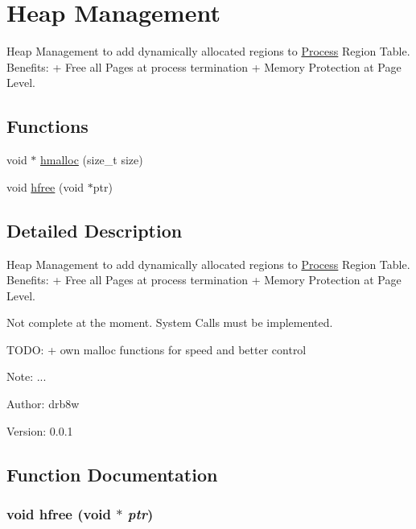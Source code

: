 \hypertarget{group___v_m_m___h_e_a_p}{
\section{Heap Management}
\label{group___v_m_m___h_e_a_p}
}
Heap Management to add dynamically allocated regions to \hyperlink{struct_process}{Process} Region Table. Benefits: + Free all Pages at process termination + Memory Protection at Page Level.  


\subsection*{Functions}
\begin{CompactItemize}
\item 
void $\ast$ \hyperlink{group___v_m_m___h_e_a_p_g3303e6b60e6122fb992cfc51ec01616f}{hmalloc} (size\_\-t size)
\item 
void \hyperlink{group___v_m_m___h_e_a_p_gb66bfae7d7a736214c5f9c9a566f2b22}{hfree} (void $\ast$ptr)
\end{CompactItemize}


\subsection{Detailed Description}
Heap Management to add dynamically allocated regions to \hyperlink{struct_process}{Process} Region Table. Benefits: + Free all Pages at process termination + Memory Protection at Page Level. 

Not complete at the moment. System Calls must be implemented.

TODO: + own malloc functions for speed and better control \begin{Desc}
\item[Note:]... \end{Desc}
\begin{Desc}
\item[Author:]drb8w \end{Desc}
\begin{Desc}
\item[Version:]0.0.1 \end{Desc}


\subsection{Function Documentation}
\hypertarget{group___v_m_m___h_e_a_p_gb66bfae7d7a736214c5f9c9a566f2b22}{
\subsubsection[{hfree}]{\setlength{\rightskip}{0pt plus 5cm}void hfree (void $\ast$ {\em ptr})}}
\label{group___v_m_m___h_e_a_p_gb66bfae7d7a736214c5f9c9a566f2b22}


